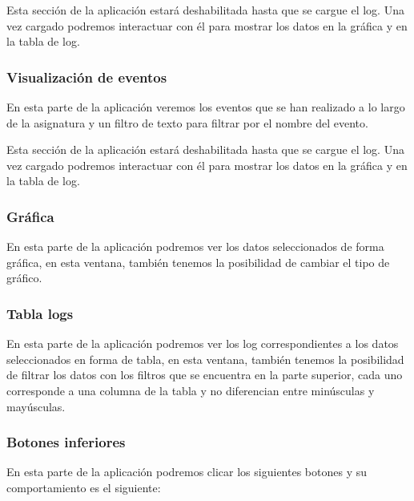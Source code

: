 
Esta sección de la aplicación estará deshabilitada hasta que se cargue el log. Una vez cargado podremos interactuar con él para mostrar los datos en la gráfica y en la tabla de log.

\subsubsection{Visualización de eventos}

En esta parte de la aplicación veremos los eventos que se han realizado a lo largo de la asignatura y un filtro de texto para filtrar por el nombre del evento.



Esta sección de la aplicación estará deshabilitada hasta que se cargue el log. Una vez cargado podremos interactuar con él para mostrar los datos en la gráfica y en la tabla de log.

\subsubsection{Gráfica}

En esta parte de la aplicación podremos ver los datos seleccionados de forma gráfica, en esta ventana, también tenemos la posibilidad de cambiar el tipo de gráfico.


\subsubsection{Tabla logs}

En esta parte de la aplicación podremos ver los log correspondientes a los datos seleccionados en forma de tabla, en esta ventana, también tenemos la posibilidad de filtrar los datos con los filtros que se encuentra en la parte superior, cada uno corresponde a una columna de la tabla y no diferencian entre minúsculas y mayúsculas.


\subsubsection{Botones inferiores}

En esta parte de la aplicación podremos clicar los siguientes botones y su comportamiento es el siguiente:

